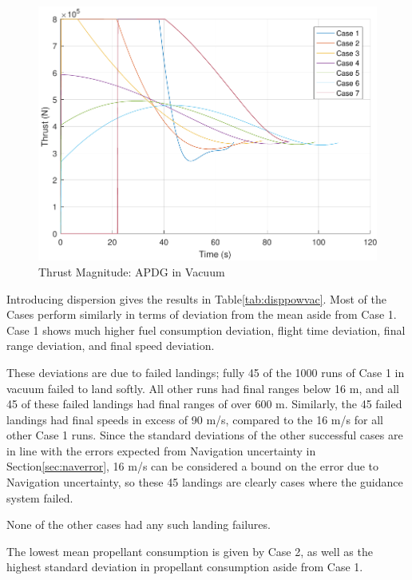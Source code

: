 \begin{figure}[H]
	\centering
	\begin{minipage}{4.5 in}
		\includegraphics[width=\linewidth]{Figures/thrpowvac.pdf}
		\caption{Thrust Magnitude: APDG in Vacuum \label{fig:thrpowvac} }
	\end{minipage}
\end{figure}

Introducing dispersion gives the results in Table\:\ref{tab:disppowvac}. Most of the Cases perform similarly in terms of deviation from the mean aside from Case 1. Case 1 shows much higher fuel consumption deviation, flight time deviation, final range deviation, and final speed deviation. 

These deviations are due to failed landings; fully 45 of the 1000 runs of Case 1 in vacuum failed to land softly. All other runs had final ranges below 16 m, and all 45 of these failed landings had final ranges of over 600 m. Similarly, the 45 failed landings had final speeds in excess of 90 m/s, compared to the 16 m/s for all other Case 1 runs. Since the standard deviations of the other successful cases are in line with the errors expected from Navigation uncertainty in Section\:\ref{sec:naverror}, 16 m/s can be considered a bound on the error due to Navigation uncertainty, so these 45 landings are clearly cases where the guidance system failed.

None of the other cases had any such landing failures.

The lowest mean propellant consumption is given by Case 2, as well as the highest standard deviation in propellant consumption aside from Case 1.

